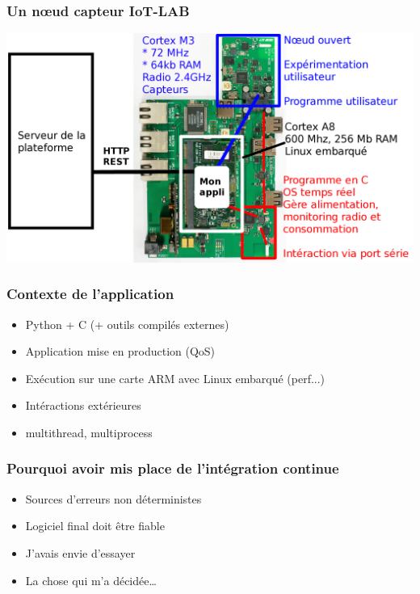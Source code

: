 \documentclass[9pt]{beamer}
\begin{document}
\subsubsection{Un nœud capteur IoT-LAB}
\begin{frame}{\subsubsecname} %
  \includegraphics[width=\textwidth]{images/gateway_m3_annote}
\end{frame}

\subsubsection{Contexte de l'application}
\begin{frame}{\subsubsecname} %
  \begin{itemize}
    \item Python + C (+ outils compilés externes)
    \item Application mise en production (QoS)
    \item Exécution sur une carte ARM avec Linux embarqué (perf...)
    \item Intéractions extérieures
    \item multithread, multiprocess
  \end{itemize}
\end{frame}


\subsubsection{Pourquoi avoir mis place de l'intégration continue}
\begin{frame}{\subsubsecname} %
  \begin{itemize}
    \item Sources d'erreurs non déterministes
      \note[item]{}
    \item Logiciel final doit être fiable
      \note[item]{}
    \item J'avais envie d'essayer
    \item La chose qui m'a décidée…
  \end{itemize}
\end{frame}
\end{document}
